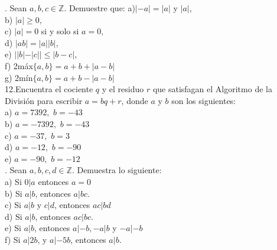 \documentclass[letterpaper]{article}
\newcommand{\Z}{\mathds{Z}}
\renewcommand{\*}{\cdot}
\theoremstyle{definition}
\begin{document}
. Sean $ a,b,c \in \Z $. Demuestre que:
a)$ | -a| = |a|  $ y $ |a| $,\\
b) $ |a| \geq 0, $\\
c) $ |a| = 0$ si y solo si $ a = 0, $\\
d) $ |ab| = |a||b| $,\\
e) $ ||b|-|c|| \leq |b-c| $,\\
f) 2máx$ \{a,b \}  = a + b + |a - b|$\\
g) 2mín$ \{a,b \}  = a + b - |a - b|$\\

\noindent12.Encuentra el cociente $ q $ y el residuo $ r $  que satisfagan el Algoritmo de la División para escribir $ a = bq + r $, donde $ a $ y $ b $ son los siguientes:\\
a) $ a = 7392,  $  $ b = -43 $\\
b) $ a = -7392, $ $ b = -43 $\\
c) $ a = -37, $ $ b = 3 $\\
d) $ a = -12, $ $ b = -90 $\\
e) $ a = -90, $ $ b = -12 $\\

. Sean $ a,b,c,d \in \Z $. Demuestra lo siguiente:\\
a) Si $ 0|a $ entonces $ a = 0 $\\
b) Si $ a|b $, entonces $ a|bc $.\\
c) Si $ a|b $ y $ c|d $, entonces $ ac|bd $\\
d) Si $ a|b $, entonces $ ac|bc $.\\
e) Si $ a|b $, entonces $ a|-b, -a |b $ y $ -a | -b $\\
f) Si $ a|2b $, y $ a | -5b $, entonces $ a|b $.
\end{document}
